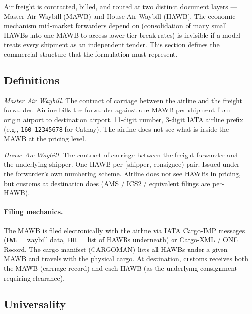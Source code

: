 \documentclass[11pt,a4paper]{article}
\theoremstyle{definition}
\begin{document}
Air freight is contracted, billed, and routed at two distinct document layers — Master
Air Waybill (MAWB) and House Air Waybill (HAWB). The economic mechanism mid-market
forwarders depend on (consolidation of many small HAWBs into one MAWB to access lower
tier-break rates) is invisible if a model treats every shipment as an independent
tender. This section defines the commercial structure that the formulation must
represent.

\subsection{Definitions}

\begin{description}[leftmargin=2cm, labelwidth=1.8cm, style=nextline]
  \item[MAWB] \emph{Master Air Waybill.} The contract of carriage between the airline
        and the freight forwarder. Airline bills the forwarder against one MAWB per
        shipment from origin airport to destination airport. 11-digit number, 3-digit
        IATA airline prefix (e.g., \texttt{160-12345678} for Cathay).
        The airline does not see what is inside the MAWB at the pricing level.
  \item[HAWB] \emph{House Air Waybill.} The contract of carriage between the freight
        forwarder and the underlying shipper. One HAWB per (shipper, consignee) pair.
        Issued under the forwarder's own numbering scheme.
        Airline does not see HAWBs in pricing, but customs at destination does
        (AMS / ICS2 / equivalent filings are per-HAWB).
\end{description}

\paragraph{Filing mechanics.}
The MAWB is filed electronically with the airline via IATA Cargo-IMP messages
(\texttt{FWB} = waybill data, \texttt{FHL} = list of HAWBs underneath) or Cargo-XML /
ONE Record. The cargo manifest (CARGOMAN) lists all HAWBs under a given MAWB and
travels with the physical cargo. At destination, customs receives both the MAWB
(carriage record) and each HAWB (as the underlying consignment requiring clearance).

\subsection{Universality}
\end{document}
